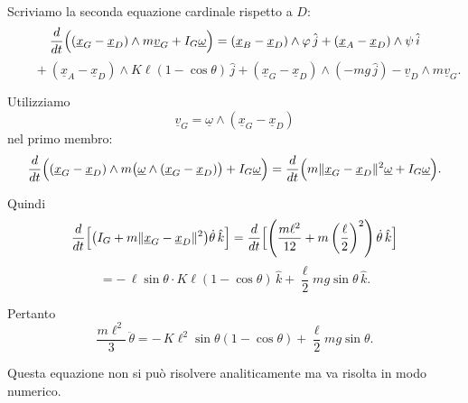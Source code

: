 \begin{example}{}
\\Scriviamo la seconda equazione cardinale rispetto a \(D\):
\[
\frac{d}{dt}\Bigl((\underline{x}_G-\underline{x}_D)\wedge m\underline{v}_G
+I_G\underline{\omega}\Bigr)
=
(\underline{x}_B-\underline{x}_D)\wedge \varphi\,\hat{j}
+
(\underline{x}_A-\underline{x}_D)\wedge \psi\,\hat{i}
\]
\[
\qquad
+
(\underline{x}_A-\underline{x}_D)\wedge K\ell(1-\cos\theta)\,\hat{j}
+
(\underline{x}_G-\underline{x}_D)\wedge (-mg\,\hat{j})
-
\underline{v}_D\wedge m\underline{v}_G.
\]

Utilizziamo
\[
\underline{v}_G=\underline{\omega}\wedge(\underline{x}_G-\underline{x}_D)
\]
nel primo membro:
\[
\frac{d}{dt}\Bigl((\underline{x}_G-\underline{x}_D)\wedge
m\bigl(\underline{\omega}\wedge(\underline{x}_G-\underline{x}_D)\bigr)
+I_G\underline{\omega}\Bigr)
=
\frac{d}{dt}\Bigl(m\|\underline{x}_G-\underline{x}_D\|^{2}\underline{\omega}
+I_G\underline{\omega}\Bigr).
\]

Quindi
\[
\frac{d}{dt}\Bigl[\bigl(I_G+m\|\underline{x}_G-\underline{x}_D\|^{2}\bigr)
\dot{\theta}\,\hat{k}\Bigr]
=
\frac{d}{dt}\Bigl[\left(\frac{m\ell^{2}}{12}+m\left(\frac{\ell}{2}\right)^{2}\right)
\dot{\theta}\,\hat{k}\Bigr]
\]
\[
=
-\,\ell\sin\theta\cdot K\ell(1-\cos\theta)\,\hat{k}
+
\frac{\ell}{2}mg\sin\theta\,\hat{k}.
\]

Pertanto
\[
\frac{m\ell^{2}}{3}\,\ddot{\theta}
=
-\,K\ell^{2}\sin\theta(1-\cos\theta)
+
\frac{\ell}{2}mg\sin\theta.
\]

Questa equazione non si può risolvere analiticamente ma va risolta in modo
numerico.
\end{example}
